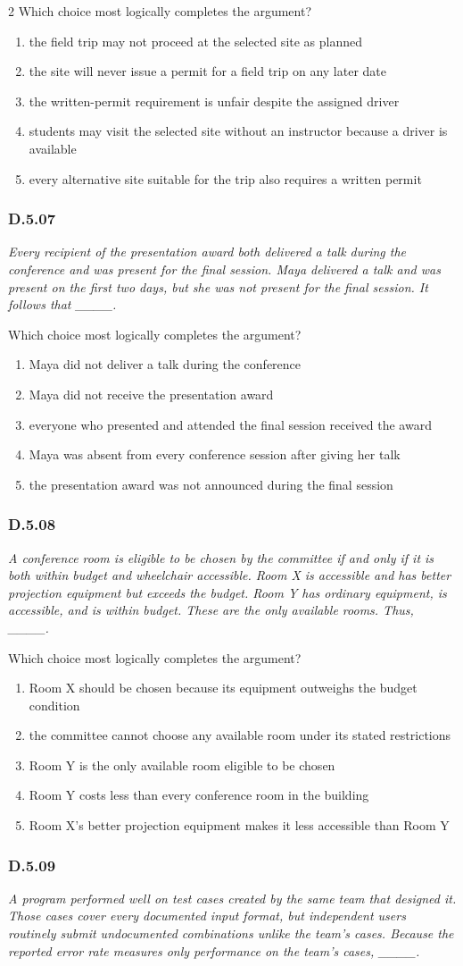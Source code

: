 \documentclass[10pt]{extarticle}
\newcommand{\choice}[1]{\item #1}
\newcommand{\bankitem}[1]{\subsubsection*{#1}}
\begin{document}
\begin{multicols}{2}
Which choice most logically completes the argument?
\begin{enumerate}[label=(\alph*)]
  \choice{the field trip may not proceed at the selected site as planned}
  \choice{the site will never issue a permit for a field trip on any later date}
  \choice{the written-permit requirement is unfair despite the assigned driver}
  \choice{students may visit the selected site without an instructor because a driver is available}
  \choice{every alternative site suitable for the trip also requires a written permit}
\end{enumerate}
\bankitem{D.5.07}
\emph{Every recipient of the presentation award both delivered a talk during the conference and was present for the final session. Maya delivered a talk and was present on the first two days, but she was not present for the final session. It follows that \_\_\_\_.}

Which choice most logically completes the argument?
\begin{enumerate}[label=(\alph*)]
  \choice{Maya did not deliver a talk during the conference}
  \choice{Maya did not receive the presentation award}
  \choice{everyone who presented and attended the final session received the award}
  \choice{Maya was absent from every conference session after giving her talk}
  \choice{the presentation award was not announced during the final session}
\end{enumerate}
\bankitem{D.5.08}
\emph{A conference room is eligible to be chosen by the committee if and only if it is both within budget and wheelchair accessible. Room X is accessible and has better projection equipment but exceeds the budget. Room Y has ordinary equipment, is accessible, and is within budget. These are the only available rooms. Thus, \_\_\_\_.}

Which choice most logically completes the argument?
\begin{enumerate}[label=(\alph*)]
  \choice{Room X should be chosen because its equipment outweighs the budget condition}
  \choice{the committee cannot choose any available room under its stated restrictions}
  \choice{Room Y is the only available room eligible to be chosen}
  \choice{Room Y costs less than every conference room in the building}
  \choice{Room X's better projection equipment makes it less accessible than Room Y}
\end{enumerate}
\bankitem{D.5.09}
\emph{A program performed well on test cases created by the same team that designed it. Those cases cover every documented input format, but independent users routinely submit undocumented combinations unlike the team's cases. Because the reported error rate measures only performance on the team's cases, \_\_\_\_.}


\end{multicols}
\end{document}
